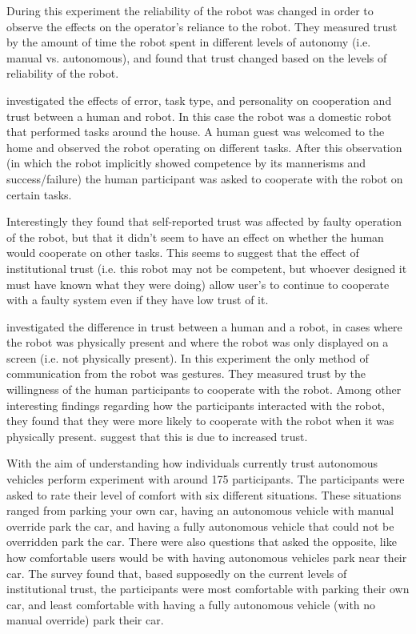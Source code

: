 During this experiment the reliability of the robot was changed in order to observe the effects on the operator's reliance to the robot. They measured trust by the amount of time the robot spent in different levels of autonomy (i.e. manual vs. autonomous), and found that trust changed based on the levels of reliability of the robot.

\citet{Salem2015-md} investigated the effects of error, task type, and personality on cooperation and trust between a human and robot. In this case the robot was a domestic robot that performed tasks around the house. A human guest was welcomed to the home and observed the robot operating on different tasks. After this observation (in which the robot implicitly showed competence by its mannerisms and success/failure) the human participant was asked to cooperate with the robot on certain tasks.

Interestingly they found that self-reported trust was affected by faulty operation of the robot, but that it didn't seem to have an effect on whether the human would cooperate on other tasks. This seems to suggest that the effect of institutional trust (i.e. this robot may not be competent, but whoever designed it must have known what they were doing) allow user's to continue to cooperate with a faulty system even if they have low trust of it.

\citet{Bainbridge2011-pl} investigated the difference in trust between a human and a robot,  in cases where the robot was physically present and where the robot was only displayed on a screen (i.e. not physically present). In this experiment the only method of communication from the robot was gestures. They measured trust by the willingness of the human participants to cooperate with the robot. Among other interesting findings regarding how the participants interacted with the robot, they found that they were more likely to cooperate with the robot when it was physically present. \citeauthor{Bainbridge2011-pl} suggest that this is due to increased trust.

With the aim of understanding how individuals currently trust autonomous vehicles \citet{Munjal_Desai2009-en} perform experiment with around 175 participants. The participants were asked to rate their level of comfort with six different situations. These situations ranged from parking your own car, having an autonomous vehicle with manual override park the car, and having a fully autonomous vehicle that could not be overridden park the car. There were also questions that asked the opposite, like how comfortable users would be with having autonomous vehicles park near their car. The survey found that, based supposedly on the current levels of institutional trust, the participants were most comfortable with parking their own car, and least comfortable with having a fully autonomous vehicle (with no manual override) park their car.
